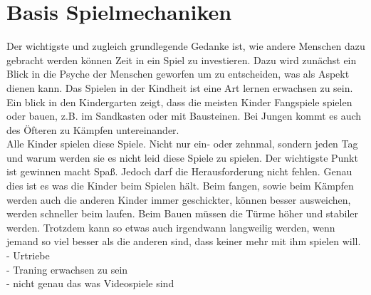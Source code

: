 \section{Basis Spielmechaniken}
\label{sec:basis_spielmechaniken}

Der wichtigste und zugleich grundlegende Gedanke ist, wie andere Menschen dazu gebracht werden können Zeit in ein Spiel zu investieren. Dazu wird zunächst ein Blick in die Psyche der Menschen geworfen um zu entscheiden, was als Aspekt dienen kann. Das Spielen in der Kindheit ist eine Art lernen erwachsen zu sein. Ein blick in den Kindergarten zeigt, dass die meisten Kinder Fangspiele spielen oder bauen, z.B. im Sandkasten oder mit Bausteinen. Bei Jungen kommt es auch des Öfteren zu Kämpfen untereinander. \\
Alle Kinder spielen diese Spiele. Nicht nur ein- oder zehnmal, sondern jeden Tag und warum werden sie es nicht leid diese Spiele zu spielen.
Der wichtigste Punkt ist gewinnen macht Spaß. Jedoch darf die Herausforderung nicht fehlen. Genau dies ist es was die Kinder beim Spielen hält. Beim fangen, sowie beim Kämpfen werden auch die anderen Kinder immer geschickter, können besser ausweichen, werden schneller beim laufen. Beim Bauen müssen die Türme höher und stabiler werden. Trotzdem kann so etwas auch irgendwann langweilig werden, wenn jemand so viel besser als die anderen sind, dass keiner mehr mit ihm spielen will.\\

- Urtriebe\\
- Traning erwachsen zu sein \\
- nicht genau das was Videospiele sind \\


